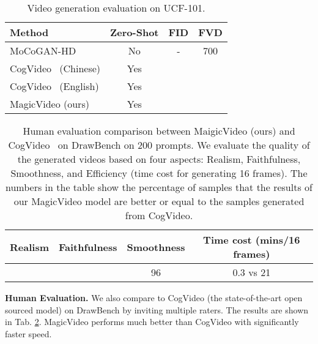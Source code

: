 \documentclass[10pt,twocolumn,letterpaper]{article}
\newcommand{\myPara}[1]{\vspace{6pt}\noindent\textbf{#1}}
\begin{document}
\begin{table}[h]
\small
\caption{Video generation evaluation on UCF-101. }
\label{tab:ucf101}
\centering
\begin{tabular}{@{}l|ccc@{}}
Method & Zero-Shot  & FID  & FVD   \\
\toprule
MoCoGAN-HD\cite{tian2021good} & No & - & 700 \\
CogVideo~\cite{CogVideo} (Chinese) & Yes &   &  \\
CogVideo~\cite{CogVideo} (English) & Yes &   &  \\
MagicVideo (ours) & Yes  &  &  \\
\end{tabular}
\end{table}



\begin{table}[t]
\caption{Human evaluation comparison between MaigicVideo (ours) and CogVideo~\cite{CogVideo} on DrawBench \cite{imagen} on 200 prompts. We evaluate the quality of the generated videos based on four aspects: Realism, Faithfulness, Smoothness, and Efficiency (time cost for generating 16 frames). 
The numbers in the table show the percentage of samples that the results of our MagicVideo model are better or equal to the samples generated from CogVideo.}
\label{tab:eval_human}
\centering
\footnotesize
\begin{tabular}{cccc}
Realism & Faithfulness & Smoothness & Time cost (mins/16 frames) \\
\toprule
 &  & 96 & 0.3 vs 21\\ 
\end{tabular}
\end{table}
 





\myPara{Human Evaluation.} We also compare to CogVideo (the state-of-the-art open sourced model) on  DrawBench \cite{imagen} by inviting multiple raters. The results are shown in Tab. \ref{tab:eval_human}.   MagicVideo performs much better than CogVideo \cite{CogVideo} with significantly faster speed.








 
\end{document}
